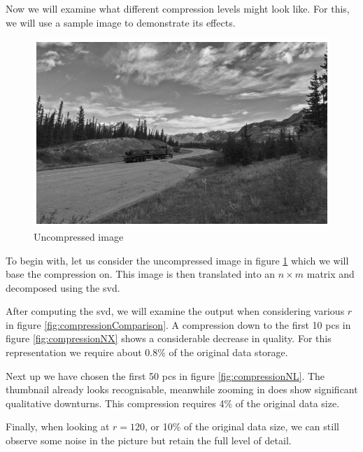 Now we will examine what different compression levels might look like.
For this, we will use a sample image to demonstrate its effects.

\begin{figure}[ht]
    \centering
    \includegraphics[width=0.725\linewidth]{external_content/media/compression_example/uncompressed.png}
    \captionsetup{justification=centering}
    \caption{Uncompressed image}
    \label{fig:uncompressed}
\end{figure}
\vspace{-2mm}

To begin with, let us consider the uncompressed image in figure \ref{fig:uncompressed} which we will base the compression on.
This image is then translated into an $n \times m$ matrix and decomposed using the \gls{svd}.

After computing the \gls{svd}, we will examine the output when considering various $r$  in figure \ref{fig:compressionComparison}.
A compression down to the first 10 \glspl{pc} in figure \ref{fig:compressionNX} shows a considerable decrease in quality.
For this representation we require about 0.8\% of the original data storage.
\medskip

Next up we have chosen the first 50 \glspl{pc} in figure \ref{fig:compressionNL}.
The thumbnail already looks recognisable, meanwhile zooming in does show significant qualitative downturns.
This compression requires 4\% of the original data size.

Finally, when looking at $r=120$, or 10\% of the original data size, we can still observe some noise in the picture but retain the full level of detail.




